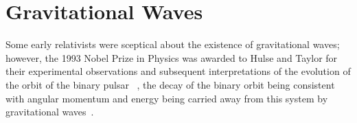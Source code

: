 \documentclass{article}
\begin{document}

\newpage




\newpage


\section{Gravitational Waves}
\label{section:gravwaves}

Some early relativists were sceptical about the existence of gravitational
waves; however, the 1993 Nobel Prize in Physics was awarded to Hulse and Taylor
for their experimental observations and subsequent interpretations of the
evolution of the orbit of the binary pulsar ~\cite{Hulse, Taylor},
the decay of the binary orbit being consistent with angular momentum and energy
being carried away from this system by gravitational waves~\cite{Will}.
\end{document}
